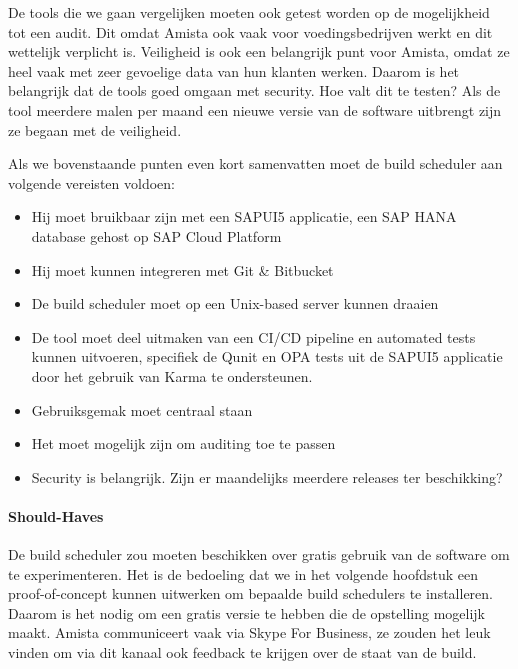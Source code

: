             De tools die we gaan vergelijken moeten ook getest worden op de mogelijkheid tot een audit. Dit omdat Amista ook vaak voor voedingsbedrijven werkt en dit wettelijk verplicht is.
            Veiligheid is ook een belangrijk punt voor Amista, omdat ze heel vaak met zeer gevoelige data van hun klanten werken. Daarom is het belangrijk dat de tools goed omgaan met security. Hoe valt dit te testen? Als de tool meerdere malen per maand een nieuwe versie van de software uitbrengt zijn ze begaan met de veiligheid.
            
            Als we bovenstaande punten even kort samenvatten moet de build scheduler aan volgende vereisten voldoen:
            \begin{itemize}
                \item Hij moet bruikbaar zijn met een SAPUI5 applicatie, een SAP HANA database gehost op SAP Cloud Platform
                \item Hij moet kunnen integreren met Git \& Bitbucket
                \item De build scheduler moet op een Unix-based server kunnen draaien
                \item De tool moet deel uitmaken van een CI/CD pipeline en automated tests kunnen uitvoeren, specifiek de Qunit en OPA tests uit de SAPUI5 applicatie door het gebruik van Karma te ondersteunen.
                \item Gebruiksgemak moet centraal staan
                \item Het moet mogelijk zijn om auditing toe te passen
                \item Security is belangrijk. Zijn er maandelijks meerdere releases ter beschikking?
            \end{itemize}
            
            
            \paragraph{Should-Haves}
            De build scheduler zou moeten beschikken over gratis gebruik van de software om te experimenteren. Het is de bedoeling dat we in het volgende hoofdstuk een proof-of-concept kunnen uitwerken om bepaalde build schedulers te installeren. Daarom is het nodig om een gratis versie te hebben die de opstelling mogelijk maakt.
            Amista communiceert vaak via Skype For Business, ze zouden het leuk vinden om via dit kanaal ook feedback te krijgen over de staat van de build.
            
